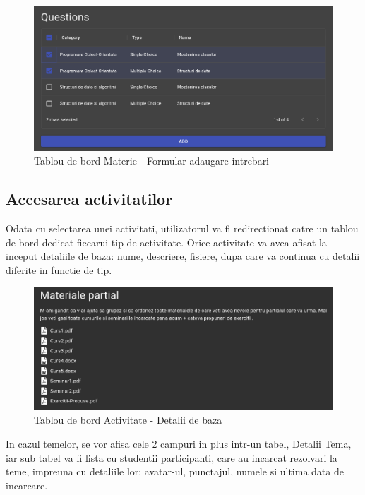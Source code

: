 \documentclass[12pt, a4paper, oneside, romanian]{teza-upb}
\begin{document}
\begin{figure}[H]
\centering
\includegraphics*[width=\columnwidth]{tablou-de-bord-materie-formular-adaugare-intrebari}
\caption{Tablou de bord Materie - Formular adaugare intrebari}
\label{tablou-de-bord-materie-formular-adaugare-intrebari}
\end{figure}

\subsection{Accesarea activitatilor}

Odata cu selectarea unei activitati, utilizatorul va fi redirectionat catre un tablou de bord dedicat fiecarui tip de activitate. Orice activitate va avea afisat la inceput detaliile de baza: nume, descriere, fisiere, dupa care va continua cu detalii diferite in functie de tip.

\begin{figure}[H]
\centering
\includegraphics*[width=\columnwidth]{tablou-de-bord-activitate-detalii-de-baza}
\caption{Tablou de bord Activitate - Detalii de baza}
\label{tablou-de-bord-activitate-detalii-de-baza}
\end{figure}

In cazul temelor, se vor afisa cele 2 campuri in plus intr-un tabel, Detalii Tema, iar sub tabel va fi lista cu studentii participanti, care au incarcat rezolvari la teme, impreuna cu detaliile lor: avatar-ul, punctajul, numele si ultima data de incarcare.
\end{document}
